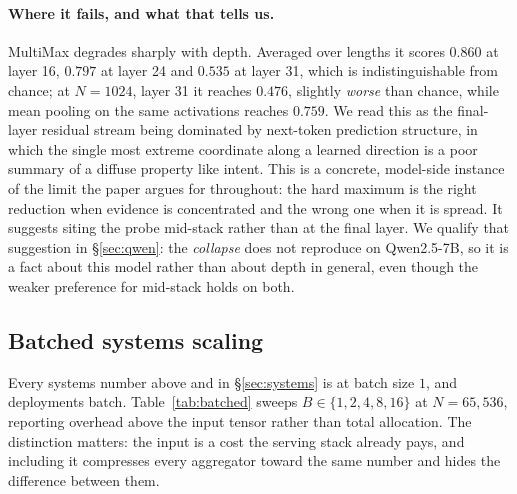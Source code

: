 \documentclass[10pt]{article}
\theoremstyle{plain}
\theoremstyle{definition}
\theoremstyle{remark}
\begin{document}
\paragraph{Where it fails, and what that tells us.} MultiMax degrades sharply with depth.
Averaged over lengths it scores $0.860$ at layer 16, $0.797$ at layer 24 and $0.535$ at
layer 31, which is indistinguishable from chance; at $N{=}1024$, layer 31 it reaches
$0.476$, slightly \emph{worse} than chance, while mean pooling on the same activations
reaches $0.759$. We read this as the final-layer residual stream being dominated by
next-token prediction structure, in which the single most extreme coordinate along a
learned direction is a poor summary of a diffuse property like intent. This is a concrete,
model-side instance of the limit the paper argues for throughout: the hard maximum is the
right reduction when evidence is concentrated and the wrong one when it is spread. It
suggests siting the probe mid-stack rather than at the final layer. We qualify that
suggestion in \S\ref{sec:qwen}: the \emph{collapse} does not reproduce on Qwen2.5-7B, so
it is a fact about this model rather than about depth in general, even though the weaker
preference for mid-stack holds on both.

\subsection{Batched systems scaling}
\label{sec:batched}

Every systems number above and in \S\ref{sec:systems} is at batch size $1$, and
deployments batch. Table~\ref{tab:batched} sweeps $B\in\{1,2,4,8,16\}$ at $N{=}65{,}536$,
reporting overhead above the input tensor rather than total allocation. The distinction
matters: the input is a cost the serving stack already pays, and including it compresses
every aggregator toward the same number and hides the difference between them.
\end{document}
